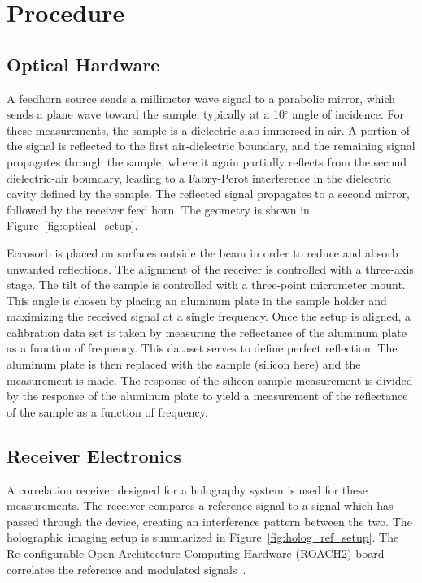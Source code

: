 \section{Procedure}
\subsection{Optical Hardware}
A feedhorn source sends a millimeter wave signal to a parabolic mirror, which sends a plane wave toward the sample, typically at a 10$^{\circ}$ angle of incidence. For these measurements, the sample is a dielectric slab immersed in air. A portion of the signal is reflected to the first air-dielectric boundary, and the remaining signal propagates through the sample, where it again partially reflects from the second dielectric-air boundary, leading to a Fabry-Perot interference in the dielectric cavity defined by the sample. The reflected signal propagates to a second mirror, followed by the receiver feed horn. The geometry is shown in Figure~\ref{fig:optical_setup}.

Eccosorb is placed on surfaces outside the beam in order to reduce and absorb unwanted reflections.   The alignment of the receiver is controlled with a three-axis stage. The tilt of the sample is controlled with a three-point micrometer mount.   This angle is chosen by placing an aluminum plate in the sample holder and maximizing the received signal at a single frequency. Once the setup is aligned, a calibration data set is taken by measuring the reflectance of the aluminum plate as a function of frequency. This dataset serves to define perfect reflection.   The aluminum plate is then replaced with the sample (silicon here) and the measurement is made. The response of the silicon sample measurement is divided by the response of the aluminum plate to yield a measurement of the reflectance of the sample as a function of frequency.

\subsection{Receiver Electronics}
A correlation receiver designed for a holography system is used for these measurements. The receiver compares a reference signal to a signal which has passed through the device, creating an interference pattern between the two.   The holographic imaging setup is summarized in Figure~\ref{fig:holog_ref_setup}.   The Re-configurable Open Architecture Computing Hardware (ROACH2) board correlates the reference and modulated signals~\cite{roach2}.

